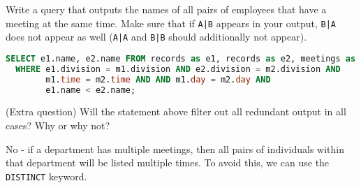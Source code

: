 \question Write a query that outputs the names of all pairs of employees that have a meeting at 
the same time. Make sure that if \texttt{A|B} appears in your output, \texttt{B|A} does not
appear as well (\texttt{A|A} and \texttt{B|B} should additionally not appear).
\begin{solution}[1.5in]
\begin{lstlisting}[language=SQL]
SELECT e1.name, e2.name FROM records as e1, records as e2, meetings as m1, meetings as m2
  WHERE e1.division = m1.division AND e2.division = m2.division AND 
        m1.time = m2.time AND AND m1.day = m2.day AND 
        e1.name < e2.name;
\end{lstlisting}
\end{solution}

\question (Extra question) Will the statement above filter out all redundant output in all cases? Why or why not?
\begin{solution}[1in]
No - if a department has multiple meetings, then all pairs of individuals within that department will be listed
multiple times. To avoid this, we can use the \texttt{DISTINCT} keyword.
\end{solution}